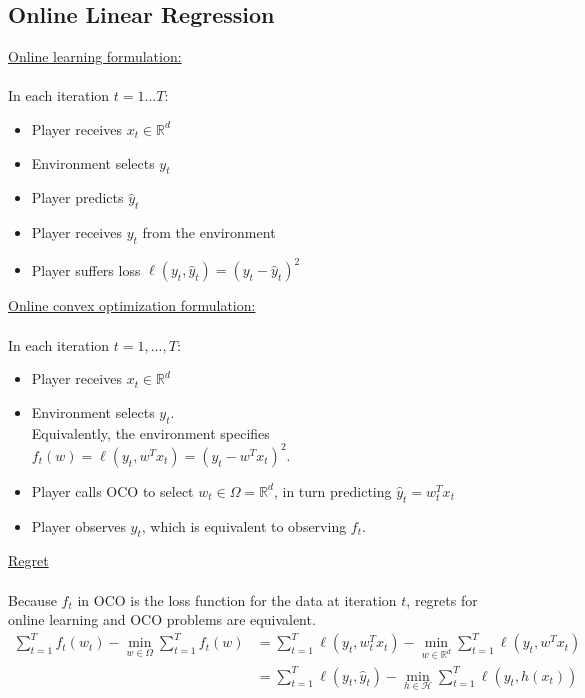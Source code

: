 \documentclass[11pt]{article}
\newcommand{\1}{\mathbb{I}} %
\begin{document}
\subsection{Online Linear Regression}
\underline{Online learning formulation:}\\\\
In each iteration $t=1...T$:
\begin{itemize}
\item Player receives $x_t \in \mathbb{R}^d$
\item Environment selects $y_t$
\item Player predicts $\hat{y}_t$
\item Player receives $y_t$ from the environment
\item Player suffers loss $\ell(y_t, \hat{y}_t) = (y_t - \hat{y}_t)^2$
\end{itemize}
\underline{Online convex optimization formulation:}\\\\
In each iteration $t=1,...,T$:
\begin{itemize}
\item Player receives $x_t \in \mathbb{R}^d$ 
\item Environment selects $y_t$. \\Equivalently, the environment specifies $f_t(w) = \ell(y_t, w^Tx_t) = (y_t - w^Tx_t)^2$.
\item Player calls OCO to select $w_t \in \Omega = \mathbb{R}^d$, in turn predicting $\hat{y}_t = w_t^Tx_t$
\item Player observes $y_t$, which is equivalent to observing $f_t$. 
\end{itemize}
\underline{Regret}\\\\
Because $f_t$ in OCO is the loss function for the data at iteration $t$, regrets for online learning and OCO problems are equivalent. 
\begin{align*}
\sum_{t=1}^Tf_t(w_t) - \min_{w \in \Omega}\sum_{t=1}^T f_t(w)
&= \sum_{t=1}^T\ell(y_t, w_t^Tx_t) - \min_{w \in \mathbb{R}^d}\sum_{t=1}^T\ell(y_t, w^Tx_t)\\
&= \sum_{t=1}^T\ell(y_t, \hat{y}_t) - \min_{h\in\mathcal{H}}\sum_{t=1}^T\ell(y_t, h(x_t))
\end{align*}
\pagebreak
\end{document}
